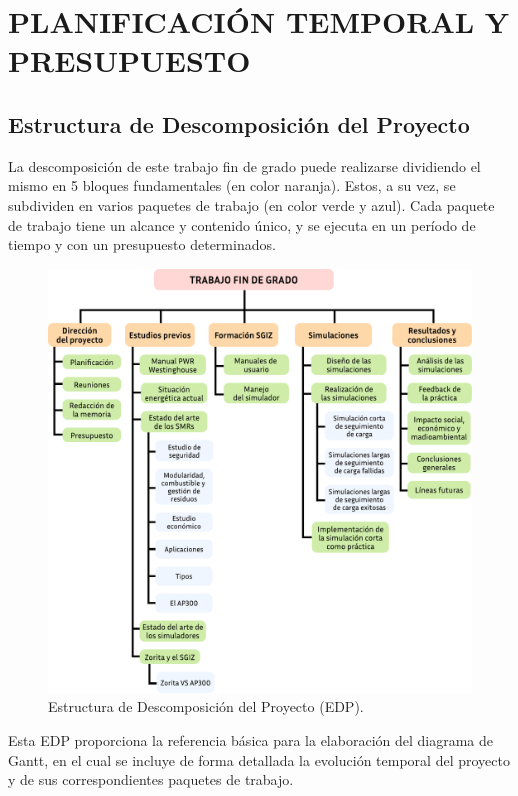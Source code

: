 \newpage
\section{PLANIFICACIÓN TEMPORAL Y PRESUPUESTO} \label{planificacion_presupuesto}

\subsection{Estructura de Descomposición del Proyecto}

La descomposición de este trabajo fin de grado puede realizarse dividiendo el mismo en 5 bloques fundamentales (en color naranja). Estos, a su vez, se subdividen en varios paquetes de trabajo (en color verde y azul). Cada paquete de trabajo tiene un alcance y contenido único, y se ejecuta en un período de tiempo y con un presupuesto determinados.

\begin{figure}[h]
    \centering
    \includegraphics[width=\textwidth]{content/figures/edp_tfg.pdf}
    \caption{Estructura de Descomposición del Proyecto (EDP).}
    \label{fig:edp_tfg}
  \end{figure}

  Esta EDP proporciona la referencia básica para la elaboración del diagrama de Gantt, en el cual se incluye de forma detallada la evolución temporal del proyecto y de sus correspondientes paquetes de trabajo.

